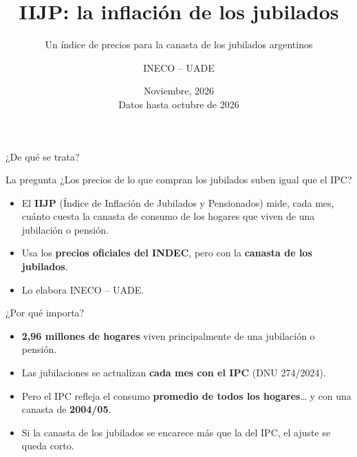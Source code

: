 \documentclass[aspectratio=169,11pt]{beamer}
\title[IIJP: la inflación de los jubilados]{IIJP: la inflación de los jubilados}
\subtitle{Un índice de precios para la canasta de los jubilados argentinos}
\author[INECO -- UADE]{INECO -- UADE}
\institute[]{}  %
\date[Noviembre, 2026]{Noviembre, 2026 \\[0.3em] {\footnotesize Datos hasta octubre de 2026}}
\begin{document}
\begin{frame}
  \titlepage
\end{frame}

\begin{frame}{¿De qué se trata?}
  \begin{block}{La pregunta}
    \large ¿Los precios de lo que compran los jubilados suben igual que el IPC?
  \end{block}
  \vspace{0.5em}
  \begin{itemize}
    \setlength{\itemsep}{0.6em}
    \item El \textbf{IIJP} (Índice de Inflación de Jubilados y Pensionados) mide, cada mes, cuánto cuesta la canasta de consumo de los hogares que viven de una jubilación o pensión.
    \item Usa los \textbf{precios oficiales del INDEC}, pero con la \textbf{canasta de los jubilados}.
    \item Lo elabora INECO -- UADE.
  \end{itemize}
\end{frame}

\begin{frame}{¿Por qué importa?}
  \begin{itemize}
    \setlength{\itemsep}{0.8em}
    \item \textbf{2,96 millones de hogares} viven principalmente de una jubilación o pensión.
    \item Las jubilaciones se actualizan \textbf{cada mes con el IPC} (DNU 274/2024).
    \item Pero el IPC refleja el consumo \textbf{promedio de todos los hogares}\ldots{} y con una canasta de \textbf{2004/05}.
    \item Si la canasta de los jubilados se encarece más que la del IPC, el ajuste se queda corto.
  \end{itemize}
\end{frame}
\end{document}
